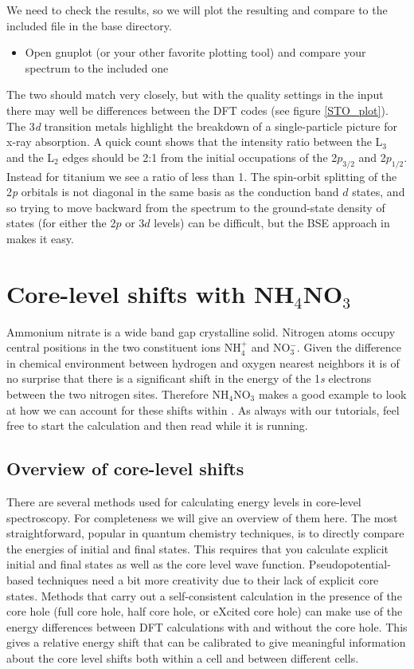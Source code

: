 \documentclass[11pt]{report}
\begin{document}
We need to check the results, so we will plot the resulting  and compare to the included  file in the base  directory.
\begin{itemize}
\item Open gnuplot (or your other favorite plotting tool) and compare your spectrum to the included one
\end{itemize}
The two should match very closely, but with the quality settings in the input there may well be differences between the DFT codes (see figure \ref{STO_plot}). The 3{\it d} transition metals highlight the breakdown of a single-particle picture for x-ray absorption. A quick count shows that the intensity ratio between the L$_3$ and the L$_2$ edges should be 2:1 from the initial occupations of the 2$p_{3/2}$ and 2$p_{1/2}$. Instead for titanium we see a ratio of less than 1. The spin-orbit splitting of the 2{\it p} orbitals is not diagonal in the same basis as the conduction band $d$ states, and so trying to move backward from the spectrum to the ground-state density of states (for either the 2$p$ or 3$d$ levels) can be difficult, but the BSE approach in  makes it easy.

\section{Core-level shifts with NH$_4$NO$_3$}

Ammonium nitrate is a wide band gap crystalline solid. Nitrogen atoms occupy central positions in the two constituent ions NH$_4^+$ and NO$_3^-$. Given the difference in chemical environment between hydrogen and oxygen nearest neighbors it is of no surprise that there is a significant shift in the energy of the 1{\it s} electrons between the two nitrogen sites. Therefore NH$_4$NO$_3$ makes a good example to look at how we can account for these shifts within . As always with our tutorials, feel free to start the calculation  and then read while it is running.

\subsection{Overview of core-level shifts}

There are several methods used for calculating energy levels in core-level spectroscopy. For completeness we will give an overview of them here. The most straightforward, popular in quantum chemistry techniques, is to directly compare the energies of initial and final states. This requires that you calculate explicit initial and final states as well as the core level wave function. Pseudopotential-based techniques need a bit more creativity due to their lack of explicit core states. Methods that carry out a self-consistent calculation in the presence of the core hole (full core hole, half core hole, or eXcited core hole) can make use of the energy differences between DFT calculations with and without the core hole. This gives a relative energy shift that can be calibrated to give meaningful information about the core level shifts both within a cell and between different cells.\cite{NeedCites}
\end{document}
